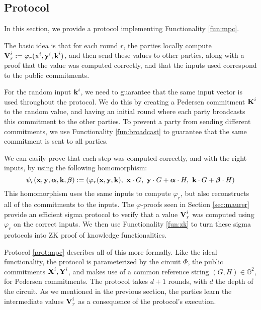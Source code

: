 \subsection{Protocol}

In this section, we provide a protocol implementing Functionality
\ref{fun:mpc}.

The basic idea is that for each round $r$, the parties locally
compute $\textbf{V}^i_r := \varphi_r(\textbf{x}^i, \textbf{y}^i, \textbf{k}^i)$, and then
send these values to other parties, along with a proof that
the value was computed correctly, and that the inputs used correspond
to the public commitments.

For the random input $\textbf{k}^i$, we need to guarantee that the same
input vector is used throughout the protocol.
We do this by creating a Pedersen commitment $\textbf{K}^i$ to the random value,
and having an initial round where each party broadcasts this commitment
to the other parties.
To prevent a party from sending different commitments, we
use Functionality \ref{fun:broadcast} to guarantee that the same
commitment is sent to all parties.

We can easily prove that each step was computed correctly, and with the right
inputs, by using the following homomorphism:
$$
\psi_r(\textbf{x}, \textbf{y}, \boldsymbol{\alpha}, \textbf{k}, \boldsymbol{\beta})
:= (\varphi_r(\textbf{x}, \textbf{y}, \textbf{k}),\ \textbf{x} \cdot G,\ \textbf{y} \cdot G + \boldsymbol{\alpha} \cdot H,\
\textbf{k} \cdot G + \boldsymbol{\beta} \cdot H) 
$$
This homomorphism uses the same inputs to compute $\varphi_r$,
but also reconstructs all of the commitments to the inputs.
The $\varphi$-proofs seen in Section \ref{sec:maurer}
provide an efficient sigma protocol to verify
that a value $\textbf{V}^i_r$ was computed using $\varphi_r$ on the correct
inputs.
We then use Functionality \ref{fun:zk} to turn these sigma protocols
into ZK proof of knowledge functionalities.

Protocol \ref{prot:mpc} describes all of this more formally.
Like the ideal functionality, the protocol is parameterized by
the circuit $\Phi$, the public commitments $\textbf{X}^i, \textbf{Y}^i$, and makes
use of a common reference string $(G, H) \in \mathbb{G}^2$, for Pedersen
commitments.
The protocol takes $d + 1$ rounds, with $d$ the depth of the circuit.
As we mentioned in the previous section, the parties learn
the intermediate values $\textbf{V}^i_r$ as a consequence of the protocol's
execution.

